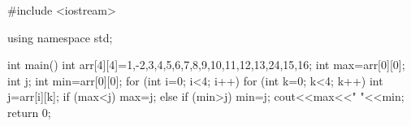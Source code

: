 #include <iostream>

using namespace std;

int main()
{
   int arr[4][4]={{1,-2,3,4},{5,6,7,8},{9,10,11,12},{13,24,15,16}};
   int max=arr[0][0]; int j; int min=arr[0][0];
   for (int i=0; i<4; i++)
   {
       for (int k=0; k<4; k++)
       {
           int  j=arr[i][k];
           if (max<j)
           max=j;
           else if (min>j)
           min=j;
       }
   }
   cout<<max<<" "<<min;
   return 0;
}